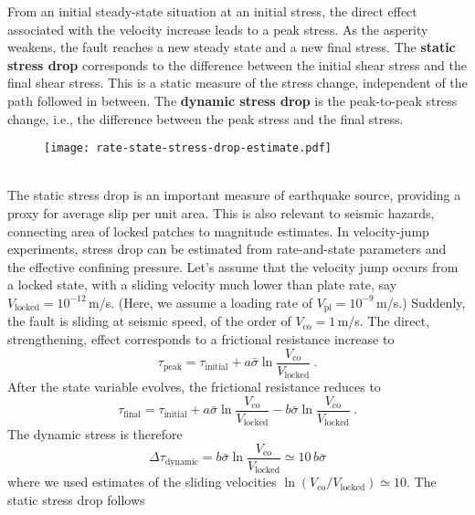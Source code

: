 \documentclass[letterpaper,12pt,]{memoir}
\begin{document}
From an initial steady-state situation at an initial stress, the direct effect associated with the velocity increase leads to a peak stress. As the asperity weakens, the fault reaches a new steady state and a new final stress. The \textbf{static stress drop} corresponds to the difference between the initial shear stress and the final shear stress. This is a static measure of the stress change, independent of the path followed in between. The \textbf{dynamic stress drop} is the peak-to-peak stress change, i.e., the difference between the peak stress and the final stress. \\
%
\begin{figure}[h]
\begin{center}
\texttt{[image: rate-state-stress-drop-estimate.pdf]}
\end{center}
\vspace{-0.5cm}
\end{figure}
%
\\
The static stress drop is an important measure of earthquake source, providing a proxy for average slip per unit area. This is also relevant to seismic hazards, connecting area of locked patches to magnitude estimates. In velocity-jump experiments, stress drop can be estimated from rate-and-state parameters and the effective confining pressure. Let's assume that the velocity jump occurs from a locked state, with a sliding velocity much lower than plate rate, say $V_\text{locked}=10^{-12}\,$m/s. (Here, we assume a loading rate of $V_\text{pl}=10^{-9}\,$m/s.) Suddenly, the fault is sliding at seismic speed, of the order of $V_\text{co}=1\,$m/s. The direct, strengthening, effect corresponds to a frictional resistance increase to \\
\begin{equation}
\tau_\text{peak}=\tau_\text{initial}+a\bar{\sigma}\ln\frac{V_\text{co}}{V_\text{locked}}~.
\end{equation}
After the state variable evolves, the frictional resistance reduces to
\begin{equation}
\tau_\text{final}=\tau_\text{initial}+a\bar{\sigma}\ln\frac{V_\text{co}}{V_\text{locked}}-b\bar{\sigma}\ln\frac{V_\text{co}}{V_\text{locked}}~.
\end{equation}
The dynamic stress is therefore
\begin{equation}
\Delta\tau_\text{dynamic}=b\bar{\sigma}\ln\frac{V_\text{co}}{V_\text{locked}}\simeq 10\,b\bar{\sigma}
\end{equation}
where we used estimates of the sliding velocities $\ln(V_\text{co}/V_\text{locked})\simeq 10$. The static stress drop follows
\end{document}
